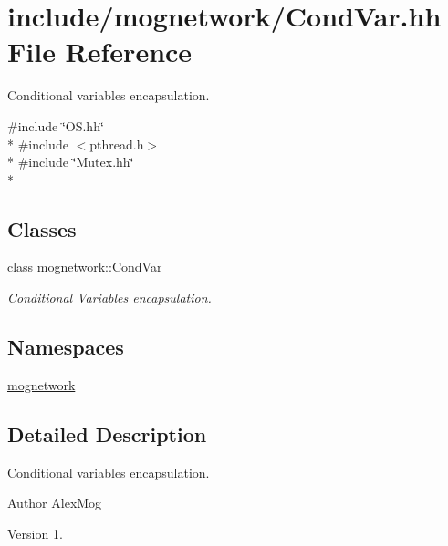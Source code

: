 \hypertarget{_cond_var_8hh}{\section{include/mognetwork/\-Cond\-Var.hh File Reference}
\label{_cond_var_8hh}
}


Conditional variables encapsulation.  


{\ttfamily \#include \char`\"{}O\-S.\-hh\char`\"{}}\\*
{\ttfamily \#include $<$pthread.\-h$>$}\\*
{\ttfamily \#include \char`\"{}Mutex.\-hh\char`\"{}}\\*
\subsection*{Classes}
\begin{DoxyCompactItemize}
\item 
class \hyperlink{classmognetwork_1_1_cond_var}{mognetwork\-::\-Cond\-Var}
\begin{DoxyCompactList}\small\item\em Conditional Variables encapsulation. \end{DoxyCompactList}\end{DoxyCompactItemize}
\subsection*{Namespaces}
\begin{DoxyCompactItemize}
\item 
\hyperlink{namespacemognetwork}{mognetwork}
\end{DoxyCompactItemize}


\subsection{Detailed Description}
Conditional variables encapsulation. \begin{DoxyAuthor}{Author}
Alex\-Mog 
\end{DoxyAuthor}
\begin{DoxyVersion}{Version}
1. 
\end{DoxyVersion}
